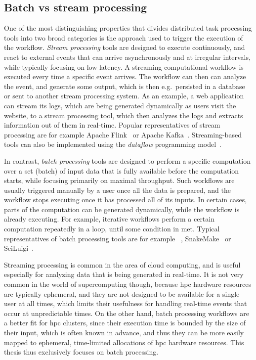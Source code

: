 \subsection*{Batch vs stream processing}
One of the most distinguishing properties that divides distributed task processing tools into two
broad categories is the approach used to trigger the execution of the workflow.
\emph{Stream processing} tools are designed to execute continuously, and react to external
events that can arrive asynchronously and at irregular intervals, while typically focusing on low
latency. A streaming computational workflow is executed every time a specific event arrives. The
workflow can then can analyze the event, and generate some output, which is then e.g.\ persisted in
a database or sent to another stream processing system. As an example, a web application can stream
its logs, which are being generated dynamically as users visit the website, to a stream processing
tool, which then analyzes the logs and extracts information out of them in real-time. Popular
representatives of stream processing are for example Apache Flink~\cite{flink} or
Apache Kafka~\cite{kafka}. Streaming-based tools can also be implemented using the
\emph{dataflow} programming model~\cite{dataflow,timely_dataflow}.

In contrast, \emph{batch processing} tools are designed to perform a specific computation over
a set (batch) of input data that is fully available before the computation starts, while focusing
primarily on maximal throughput. Such workflows are usually triggered manually by a user once all
the data is prepared, and the workflow stops executing once it has processed all of its inputs. In
certain cases, parts of the computation can be generated dynamically, while the workflow is already
executing. For example, iterative workflows perform a certain computation repeatedly in a loop,
until some condition in met. Typical representatives of batch processing tools are for example
\dask{}~\cite{dask}, SnakeMake~\cite{snakemake} or
SciLuigi~\cite{sciluigi}.

Streaming processing is common in the area of cloud computing, and is useful especially for
analyzing data that is being generated in real-time. It is not very common in the world of
supercomputing though, because \gls{hpc} hardware resources are typically
ephemeral, and they are not designed to be available for a single user at all times, which limits
their usefulness for handling real-time events that occur at unpredictable times. On the other
hand, batch processing workflows are a better fit for \gls{hpc} clusters, since
their execution time is bounded by the size of their input, which is often known in advance, and
thus they can be more easily mapped to ephemeral, time-limited allocations of
\gls{hpc} hardware resources. This thesis thus exclusively focuses on batch
processing.


